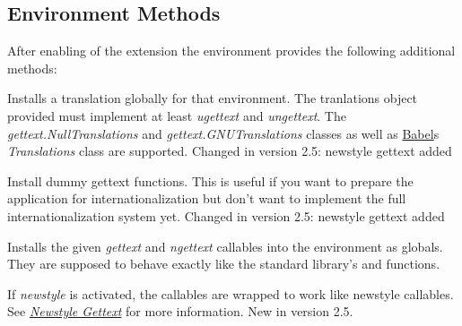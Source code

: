 \documentclass[a4paper,10pt,english]{sphinxmanual}
\begin{document}
\subsection{Environment Methods}
\label{extensions:environment-methods}
After enabling of the extension the environment provides the following
additional methods:

\begin{fulllineitems}
\label{extensions:jinja2.Environment.install_gettext_translations}
Installs a translation globally for that environment.  The tranlations
object provided must implement at least \emph{ugettext} and \emph{ungettext}.
The \emph{gettext.NullTranslations} and \emph{gettext.GNUTranslations} classes
as well as \href{http://babel.edgewall.org/}{Babel}s \emph{Translations} class are supported.
Changed in version 2.5: newstyle gettext added
\end{fulllineitems}


\begin{fulllineitems}
\label{extensions:jinja2.Environment.install_null_translations}
Install dummy gettext functions.  This is useful if you want to prepare
the application for internationalization but don't want to implement the
full internationalization system yet.
Changed in version 2.5: newstyle gettext added
\end{fulllineitems}


\begin{fulllineitems}
\label{extensions:jinja2.Environment.install_gettext_callables}
Installs the given \emph{gettext} and \emph{ngettext} callables into the
environment as globals.  They are supposed to behave exactly like the
standard library's  and
 functions.

If \emph{newstyle} is activated, the callables are wrapped to work like
newstyle callables.  See {\hyperref[extensions:newstyle-gettext]{\emph{Newstyle Gettext}}} for more information.
New in version 2.5.
\end{fulllineitems}
\end{document}
